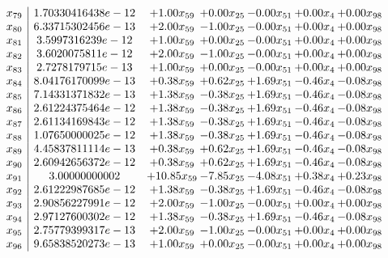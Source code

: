 \documentclass[8pt]{article}
\begin{document}
\[\begin{array}{c| c c@{\hskip 2pt} c@{\hskip 2pt} c@{\hskip 2pt} c@{\hskip 2pt} c@{\hskip 2pt} }
 x_{79}   &  1.70330416438e-12 & +  1.00 x_{59} & +  0.00 x_{25} & -0.00 x_{51} & +  0.00 x_{4} & +  0.00 x_{98}\\
 x_{80}   &  6.33715302456e-13 & +  2.00 x_{59} & -1.00 x_{25} & -0.00 x_{51} & +  0.00 x_{4} & +  0.00 x_{98}\\
 x_{81}   &  3.5997316239e-12 & +  1.00 x_{59} & +  0.00 x_{25} & -0.00 x_{51} & +  0.00 x_{4} & +  0.00 x_{98}\\
 x_{82}   &  3.6020075811e-12 & +  2.00 x_{59} & -1.00 x_{25} & -0.00 x_{51} & +  0.00 x_{4} & +  0.00 x_{98}\\
 x_{83}   &  2.7278179715e-13 & +  1.00 x_{59} & +  0.00 x_{25} & -0.00 x_{51} & +  0.00 x_{4} & +  0.00 x_{98}\\
 x_{84}   &  8.04176170099e-13 & +  0.38 x_{59} & +  0.62 x_{25} & +  1.69 x_{51} & -0.46 x_{4} & -0.08 x_{98}\\
 x_{85}   &  7.14331371832e-13 & +  1.38 x_{59} & -0.38 x_{25} & +  1.69 x_{51} & -0.46 x_{4} & -0.08 x_{98}\\
 x_{86}   &  2.61224375464e-12 & +  1.38 x_{59} & -0.38 x_{25} & +  1.69 x_{51} & -0.46 x_{4} & -0.08 x_{98}\\
 x_{87}   &  2.61134169843e-12 & +  1.38 x_{59} & -0.38 x_{25} & +  1.69 x_{51} & -0.46 x_{4} & -0.08 x_{98}\\
 x_{88}   &  1.07650000025e-12 & +  1.38 x_{59} & -0.38 x_{25} & +  1.69 x_{51} & -0.46 x_{4} & -0.08 x_{98}\\
 x_{89}   &  4.45837811114e-13 & +  0.38 x_{59} & +  0.62 x_{25} & +  1.69 x_{51} & -0.46 x_{4} & -0.08 x_{98}\\
 x_{90}   &  2.60942656372e-12 & +  0.38 x_{59} & +  0.62 x_{25} & +  1.69 x_{51} & -0.46 x_{4} & -0.08 x_{98}\\
 x_{91}   &  3.00000000002 & + 10.85 x_{59} & -7.85 x_{25} & -4.08 x_{51} & +  0.38 x_{4} & +  0.23 x_{98}\\
 x_{92}   &  2.61222987685e-12 & +  1.38 x_{59} & -0.38 x_{25} & +  1.69 x_{51} & -0.46 x_{4} & -0.08 x_{98}\\
 x_{93}   &  2.90856227991e-12 & +  2.00 x_{59} & -1.00 x_{25} & -0.00 x_{51} & +  0.00 x_{4} & +  0.00 x_{98}\\
 x_{94}   &  2.97127600302e-12 & +  1.38 x_{59} & -0.38 x_{25} & +  1.69 x_{51} & -0.46 x_{4} & -0.08 x_{98}\\
 x_{95}   &  2.75779399317e-13 & +  2.00 x_{59} & -1.00 x_{25} & -0.00 x_{51} & +  0.00 x_{4} & +  0.00 x_{98}\\
 x_{96}   &  9.65838520273e-13 & +  1.00 x_{59} & +  0.00 x_{25} & -0.00 x_{51} & +  0.00 x_{4} & +  0.00 x_{98}\\

\end{array}\]
\end{document}
